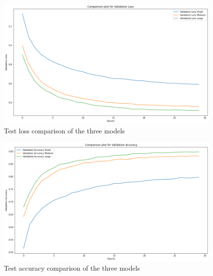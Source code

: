 \documentclass[letterpaper]{article} %
\begin{document}
\begin{figure}[htbp]
\captionsetup[subfigure]{justification=centering}
  \centering
  \includegraphics[scale = 0.25]{image/val_loss.png}
  \caption{Test loss comparison of the three models}
\end{figure}

\begin{figure}[htbp]
\captionsetup[subfigure]{justification=centering}
  \centering
  \includegraphics[scale = 0.25]{image/val_acc.png}
  \caption{Test accuracy comparison of the three models}
\end{figure}

\begin{table}[h]
    \centering
    \caption{Train and test accuracy comparisons for models}
    \label{tab:example}
\end{table}
\end{document}
